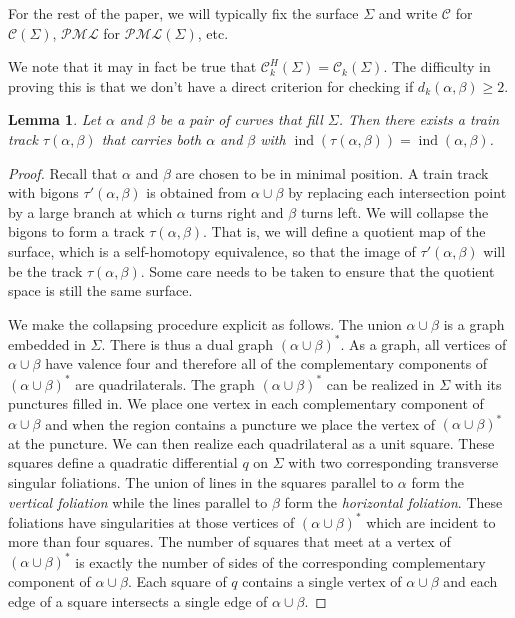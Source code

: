 \documentclass[11pt]{article}
\newtheorem{lemma}[thm]{Lemma}
\theoremstyle{remark}
\def\PML{{\mathcal{PML}}}
\def\C{{\mathcal C}}
\def\ind{\operatorname{ind}}
\begin{document}
For the rest of the paper, we will typically fix the surface $\Sigma$
and write $\C$ for $\C(\Sigma)$, $\PML$ for $\PML(\Sigma)$, etc.

We note that it may in fact be true that $\C^H_k(\Sigma) = \C_k(\Sigma)$.
The difficulty in proving this is that we don't have a direct criterion for
checking if $d_k(\alpha, \beta) \ge 2$.


\begin{lemma}\label{track index}
Let $\alpha$ and $\beta$ be a pair of curves that fill $\Sigma$. Then there exists a train track $\tau(\alpha, \beta)$ that carries both $\alpha$ and $\beta$ with $\ind(\tau(\alpha,\beta)) = \ind(\alpha,\beta)$.
\end{lemma}

\begin{proof}
Recall that $\alpha$ and $\beta$ are chosen to be in minimal position.
A train track with bigons $\tau'(\alpha,\beta)$ is obtained from $\alpha\cup \beta$ by
replacing each intersection point by a large branch at which $\alpha$ turns
right and $\beta$ turns left.
We will collapse the bigons to form a track $\tau(\alpha,\beta)$. That is, we will
define a quotient map of the surface,
which is a self-homotopy equivalence, so that the image of $\tau'(\alpha,\beta)$ will be the track $\tau(\alpha, \beta)$. Some care needs to be taken to ensure that the quotient space is still the same surface.

We make the collapsing procedure explicit as follows.
The union $\alpha\cup \beta$ is a graph embedded in $\Sigma$. There is thus a dual
graph $(\alpha\cup\beta)^*$.
As a graph, all vertices of $\alpha\cup \beta$ have valence four and therefore all of
the complementary components of $(\alpha\cup\beta)^*$ are quadrilaterals. The graph
$(\alpha \cup \beta)^*$ can be realized in $\Sigma$ with its punctures filled in.
We place one vertex in each
complementary component of $\alpha\cup\beta$ and when the region contains a puncture we
place the vertex of $(\alpha\cup \beta)^*$ at the puncture.
We can then realize each quadrilateral as a unit square.
These squares define a quadratic differential $q$ on $\Sigma$ with two corresponding
transverse singular foliations.
The union of lines in the squares parallel to $\alpha$ form the {\em vertical
foliation} while the lines parallel to $\beta$ form the {\em horizontal foliation}.
These foliations have singularities at those vertices of $(\alpha \cup \beta)^*$
which are incident to more than four squares.
The number of squares that meet at a vertex of $(\alpha\cup \beta)^*$ is exactly the
number of sides of the corresponding complementary component of $\alpha\cup \beta$.
Each square of $q$ contains a single vertex of $\alpha\cup\beta$ and each edge
of a square intersects a single edge of $\alpha\cup\beta$.


\end{proof}
\end{document}
